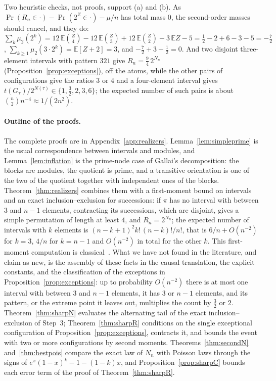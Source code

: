\documentclass[11pt,a4paper]{article}
\theoremstyle{plain}
\theoremstyle{definition}
\theoremstyle{remark}
\begin{document}
\noindent Two heuristic checks, not proofs, support (a) and (b). As $\Pr(R_n\in\cdot)-\Pr(2^Z\in\cdot)-\mu/n$ has total mass $0$, the second-order masses should cancel, and they do: $\sum_k\mu_2(2^k)=12\,\mathbb E\binom Z4-12\,\mathbb E\binom Z3+12\,\mathbb E\binom Z2-3\,\mathbb EZ-5=\tfrac12-2+6-3-5=-\tfrac72$, $\sum_{k\ge1}\mu_2(3\cdot2^k)=\mathbb E[Z+2]=3$, and $-\tfrac72+3+\tfrac12=0$. And two disjoint three-element intervals with pattern $321$ give $R_n=\tfrac94\,2^{N_n}$ (Proposition~\ref{prop:exceptions}), off the atoms, while the other pairs of configurations give the ratios $3$ or $4$ and a four-element interval gives $t(G_\tau)/2^{N(\tau)}\in\{1,\tfrac32,2,3,6\}$; the expected number of such pairs is about $\binom n2n^{-4}\approx1/(2n^2)$.

\paragraph{Outline of the proofs.}
The complete proofs are in Appendix~\ref{app:realizers}. Lemma~\ref{lem:simpleprime} is the usual correspondence between intervals and modules, and Lemma~\ref{lem:inflation} is the prime-node case of Gallai's decomposition: the blocks are modules, the quotient is prime, and a transitive orientation is one of the two of the quotient together with independent ones of the blocks. Theorem~\ref{thm:realizers} combines them with a first-moment bound on intervals and an exact inclusion--exclusion for successions: if $\pi$ has no interval with between $3$ and $n-1$ elements, contracting its successions, which are disjoint, gives a simple permutation of length at least $4$, and $R_n=2^{N_n}$; the expected number of intervals with $k$ elements is $(n-k+1)^2k!\,(n-k)!/n!$, that is $6/n+O(n^{-2})$ for $k=3$, $4/n$ for $k=n-1$ and $O(n^{-2})$ in total for the other $k$. This first-moment computation is classical~\citep{corteel2006,albert2003}. What we have not found in the literature, and claim as new, is the assembly of these facts in the causal translation, the explicit constants, and the classification of the exceptions in Proposition~\ref{prop:exceptions}: up to probability $O(n^{-2})$ there is at most one interval with between $3$ and $n-1$ elements, it has $3$ or $n-1$ elements, and its pattern, or the extreme point it leaves out, multiplies the count by $\tfrac32$ or $2$. Theorem~\ref{thm:sharpN} evaluates the alternating tail of the exact inclusion--exclusion of Step~3; Theorem~\ref{thm:sharpR} conditions on the single exceptional configuration of Proposition~\ref{prop:exceptions}, contracts it, and bounds the event with two or more configurations by second moments. Theorems~\ref{thm:secondN} and~\ref{thm:bestpois} compare the exact law of $N_n$ with Poisson laws through the signs of $e^x(1-x)^k-1-(1-k)x$, and Proposition~\ref{prop:sharpC} bounds each error term of the proof of Theorem~\ref{thm:sharpR}.
\end{document}
